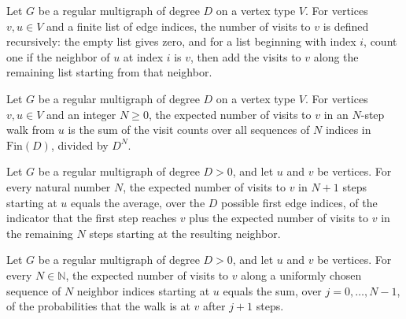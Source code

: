 \begin{definition}
\label{Randomized.RegularMultigraph.visits}
\leanok
Let $G$ be a regular multigraph of degree $D$ on a vertex type $V$. For vertices $v,u\in
V$ and a finite list of edge indices, the number of visits to $v$ is defined
recursively: the empty list gives zero, and for a list beginning with index $i$, count
one if the neighbor of $u$ at index $i$ is $v$, then add the visits to $v$ along the
remaining list starting from that neighbor.
\end{definition}

\begin{definition}
\label{Randomized.RegularMultigraph.expVisits}
\leanok
{}
Let $G$ be a regular multigraph of degree $D$ on a vertex type $V$. For vertices $v,u\in
V$ and an integer $N\ge 0$, the expected number of visits to $v$ in an $N$-step walk
from $u$ is the sum of the visit counts over all sequences of $N$ indices in
$\mathrm{Fin}(D)$, divided by $D^N$.
\end{definition}

\begin{theorem}
\label{Randomized.RegularMultigraph.expVisits_succ}
\leanok
{}
Let $G$ be a regular multigraph of degree $D>0$, and let $u$ and $v$ be vertices. For
every natural number $N$, the expected number of visits to $v$ in $N+1$ steps starting
at $u$ equals the average, over the $D$ possible first edge indices, of the indicator
that the first step reaches $v$ plus the expected number of visits to $v$ in the
remaining $N$ steps starting at the resulting neighbor.
\end{theorem}

\begin{theorem}
\label{Randomized.RegularMultigraph.expVisits_eq}
\leanok
{}
Let $G$ be a regular multigraph of degree $D>0$, and let $u$ and $v$ be vertices. For
every $N\in\mathbb{N}$, the expected number of visits to $v$ along a uniformly chosen
sequence of $N$ neighbor indices starting at $u$ equals the sum, over $j=0,\ldots,N-1$,
of the probabilities that the walk is at $v$ after $j+1$ steps.
\end{theorem}

